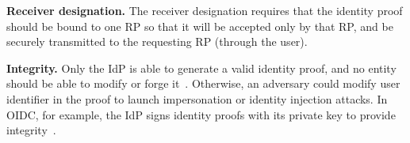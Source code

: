 \vspace{1mm}\noindent\textbf{Receiver  designation.} The receiver  designation requires that the identity proof should be bound to one RP so that it will be accepted only by that RP, and be securely transmitted to the requesting RP (through the user). 

\vspace{1mm}\noindent\textbf{Integrity.} Only the IdP is able to generate a valid identity proof,
    and no entity should be able to modify or forge it~\cite{WangZLG16}. Otherwise, an adversary could modify user identifier in the proof to launch impersonation or identity injection attacks. In OIDC, for example, the IdP signs identity proofs with its private key to provide integrity~\cite{WangCW12, SomorovskyMSKJ12}.


